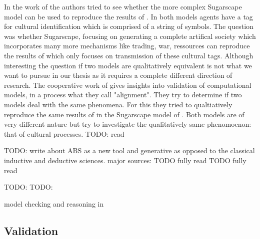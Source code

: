 In the work of \cite{axtell_aligning_1996} the authors tried to see whether the more complex Sugarscape model can be used to reproduce the results of \cite{axelrod_convergence_1995}. In both models agents have a tag for cultural identification which is comprised of a string of symbols. The question was whether Sugarscape, focusing on generating a complete artifical society which incorporates many more mechanisms like trading, war, ressources can reproduce the results of \cite{axelrod_convergence_1995} which only focuses on transmission of these cultural tags. Although interesting the question if two models are qualitatively equivalent is not what we want to pursue in our thesis as it requires a complete different direction of research.
The cooperative work of \cite{axtell_aligning_1996} gives insights into validation of computational models, in a process what they call "alignment". They try to determine if two models deal with the same phenomena. For this they tried to qualtiatively reproduce the same results of \cite{axelrod_convergence_1995} in the Sugarscape model of \cite{epstein_growing_1996}. Both models are of very different nature but try to investigate the qualitatively same phenomoenon: that of cultural processes. TODO: read

TODO: write about ABS as a new tool and  generative as opposed to the classical inductive and deductive sciences. major sources: 
TODO fully read \cite{epstein_chapter_2006}
TODO fully read \cite{epstein_generative_2012}

TODO: \cite{galan_errors_2009}
TODO: \cite{windrum_empirical_2007}

model checking and reasoning in \cite{hutton_tutorial_1999}\\

\subsection{Validation}
